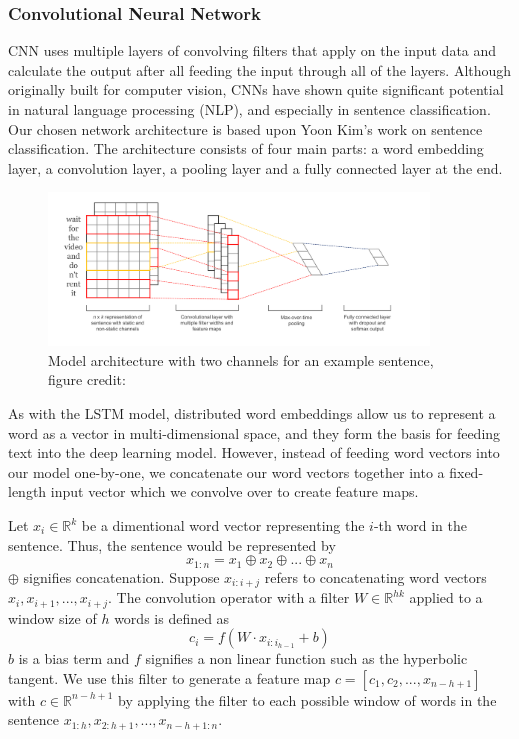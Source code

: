 \documentclass[conference]{IEEEtran}
\begin{document}
\subsubsection{Convolutional Neural Network}
\label{model:back:cnn}
    CNN uses multiple layers of convolving filters that apply on the input data and
    calculate the output after all feeding the input through all of the layers. Although
    originally built for computer vision, CNNs have shown quite significant potential in
    natural language processing (NLP), and especially in sentence classification.
    Our chosen network architecture is based upon Yoon Kim's work on sentence
    classification\cite{kim2014convolutional}. The architecture consists of four
    main parts: a word
    embedding layer, a convolution layer, a pooling layer and a fully connected layer
    at the end.
    \begin{figure}
    \center\includegraphics[width=0.9\textwidth]{figure/sc_model}
    \caption{Model architecture with two channels for an example sentence,
     figure credit: \cite{kim2014convolutional}}
    \end{figure}

    As with the LSTM model, distributed word embeddings allow us to represent a
    word as a vector in multi-dimensional space, and they form the basis for feeding
    text into the deep learning model. However, instead of feeding word vectors into
    our model one-by-one, we concatenate our word vectors together into a fixed-length
    input vector which we convolve over to create feature maps.

    Let $x_{i} \in \mathbb{R}^k$ be a dimentional word vector representing the $i$-th word in the
    sentence. Thus, the sentence would be represented by
    \begin{equation}
    x_{1:n} = x_1 \oplus x_2 \oplus ... \oplus x_n
    \end{equation}
    $\oplus$ signifies concatenation. Suppose $x_{i:i+j}$ refers to concatenating
    word vectors $x_i, x_{i+1}, ... , x_{i+j}$. The convolution operator with a filter
    $W \in \mathbb{R}^{hk}$ applied to a window size of $h$
    words is defined as
    \begin{equation}
    c_i = f(W \cdot x_{i:i_{h-1}} + b)
    \end{equation}
    $b$ is a bias term and $f$ signifies a non linear function such as the hyperbolic
    tangent. We use this filter to generate a feature map $c = [c_1, c_2, ... ,x_{n-h+1}]$
    with $c \in \mathbb{R}^{n-h+1}$ by applying the filter to each possible window of words in
    the sentence $x_{1:h}, x_{2:h+1}, ... ,x_{n-h+1:n}$.
\end{document}
